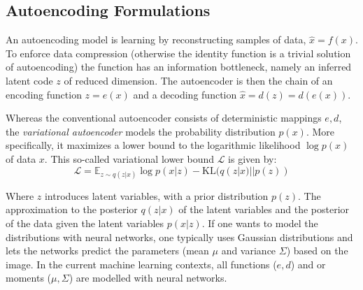 	\subsection{Autoencoding Formulations}\label{sec:autoencoding}
		An autoencoding model is learning by reconstructing samples of data, $\hat x = f(x)$. To enforce data compression (otherwise the identity function is a trivial solution of autoencoding) the function has an information bottleneck, namely an inferred latent code $z$ of reduced dimension. The autoencoder is then the chain of an encoding function $z = e(x)$ and a decoding function $\hat x = d(z) = d(e(x))$.

		Whereas the conventional autoencoder consists of deterministic mappings $e, d$, the \textit{variational autoencoder} models the probability distribution $p(x)$. More specifically, it maximizes a lower bound to the logarithmic likelihood $\log p(x)$ of data $x$. This so-called variational lower bound $\mathcal{L}$ is given by:
		\begin{equation}\label{eq:vae}
			\mathcal{L} = \mathds{E}_{z\sim q(z|x)}  \log p(x|z) - \textrm{KL}(q(z|x)||p(z))
		\end{equation}

		Where $z$ introduces latent variables, with a prior distribution $p(z)$. The approximation to the posterior $q(z|x)$ of the latent variables and the posterior of the data given the latent variables $p(x|z)$. If one wants to model the distributions with neural networks, one typically uses Gaussian distributions and lets the networks predict the parameters (mean $\mu$ and variance $\Sigma$) based on the image.
		In the current machine learning contexts, all functions ($e, d$) and or moments ($\mu, \Sigma$) are modelled with neural networks.

